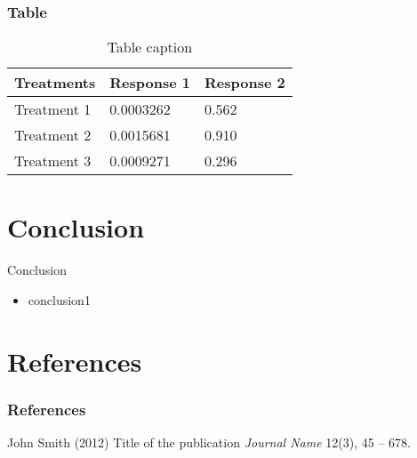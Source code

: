 \documentclass{beamer}
\begin{document}

\begin{frame}
\frametitle{Table}
\begin{table}
\begin{tabular}{l l l}
\toprule
\textbf{Treatments} & \textbf{Response 1} & \textbf{Response 2}\\
\midrule
Treatment 1 & 0.0003262 & 0.562 \\
Treatment 2 & 0.0015681 & 0.910 \\
Treatment 3 & 0.0009271 & 0.296 \\
\bottomrule
\end{tabular}
\caption{Table caption}
\end{table}
\end{frame}

\section{Conclusion}
\begin{frame}{Conclusion}
    \begin{itemize}
        \item conclusion1
    \end{itemize}
\end{frame}

\section{References}
\begin{frame}
\frametitle{References}
\footnotesize{
\begin{thebibliography}{99} %
 John Smith (2012)
\newblock Title of the publication
\newblock \emph{Journal Name} 12(3), 45 -- 678.
\end{thebibliography}
}
\end{frame}

\end{document}
